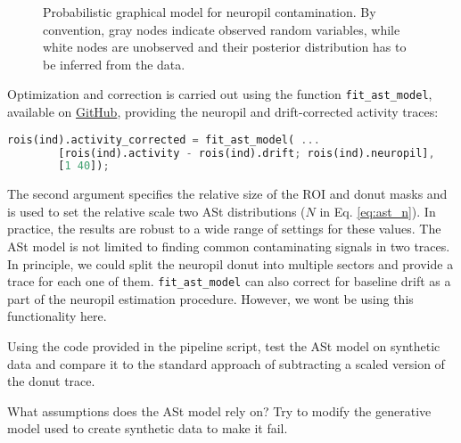 \documentclass[a4paper]{report}
\newcommand{\nexercise}[0]{\arabic{exercises}\addtocounter{exercises}{1}}
\begin{document}
\begin{figure}[b]
  \centering
  \caption{Probabilistic graphical model for neuropil contamination. By convention, gray nodes indicate observed random variables, while white nodes are unobserved and their posterior distribution has to be inferred from the data.}
  \label{fig:neuropil}
\end{figure}

Optimization and correction is carried out using the function \texttt{fit\_ast\_model}, available on \href{https://github.com/BaselLaserMouse/ast\_model}{GitHub}, providing the neuropil and drift-corrected activity traces: 
\begin{lstlisting}[language=Octave]
rois(ind).activity_corrected = fit_ast_model( ...
        [rois(ind).activity - rois(ind).drift; rois(ind).neuropil], 
        [1 40]);
\end{lstlisting}

The second argument specifies the relative size of the ROI and donut masks and is used to set the relative scale two ASt distributions ($N$ in Eq. \ref{eq:ast_n}). 
In practice, the results are robust to a wide range of settings for these values. 
The ASt model is not limited to finding common contaminating signals in two traces. 
In principle, we could split the neuropil donut into multiple sectors and provide a trace for each one of them.
\texttt{fit\_ast\_model} can also correct for baseline drift as a part of the neuropil estimation procedure. However, we wont be using this functionality here.

\begin{exercisebox}[frametitle={Exercise \nexercise: Test ASt model on synthetic data}]
Using the code provided in the pipeline script, test the ASt model on synthetic data and compare it to the standard approach of subtracting a scaled version of the donut trace.

What assumptions does the ASt model rely on? Try to modify the generative model used to create synthetic data to make it fail.
\end{exercisebox}
\end{document}
